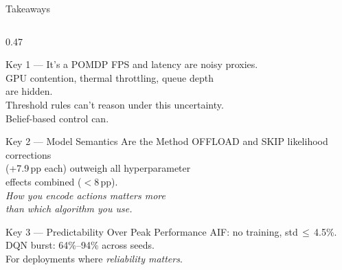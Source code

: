 \documentclass[aspectratio=169,10pt]{beamer}
\begin{document}
\begin{frame}{Takeaways}
\begin{columns}[T]
  \begin{column}{0.47\textwidth}
    \vspace{0.1cm}
    \begin{block}{Key 1 — It's a POMDP}
      \small
      FPS and latency are noisy proxies.\\
      GPU contention, thermal throttling, queue depth\\
      are hidden.\\[0.3em]
      Threshold rules can't reason under this uncertainty.\\
      Belief-based control can.
    \end{block}
    \vspace{0.35em}
    \begin{block}{Key 2 — Model Semantics Are the Method}
      \small
      OFFLOAD and SKIP likelihood corrections\\
      (+7.9\,pp each) outweigh all hyperparameter\\
      effects combined ($<$8\,pp).\\[0.3em]
      \emph{How you encode actions matters more\\
      than which algorithm you use.}
    \end{block}
    \vspace{0.35em}
    \begin{block}{Key 3 — Predictability Over Peak Performance}
      \small
      AIF: no training, std\,$\leq$\,4.5\%.\\
      DQN burst: 64\%–94\% across seeds.\\[0.3em]
      For deployments where \emph{reliability matters}.
    \end{block}
  \end{column}


\end{columns}
\end{frame}
\end{document}
